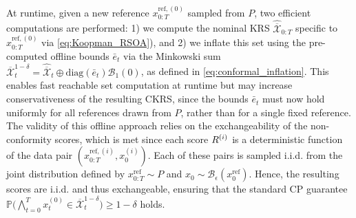 At runtime, given a new reference $x_{0:T}^{\text{ref}, (0)}$ sampled from $P$, two efficient computations are performed: 1) we compute the nominal KRS $\hat{\overline{\mathcal{X}}}_{0:T}$ specific to $x_{0:T}^{\text{ref}, (0)}$ via \eqref{eq:Koopman_RSOA}), and 2) we inflate this set using the pre-computed offline bounds $\bar e_t$ via the Minkowski sum $\overline{\mathcal{X}}_{t}^{1-\delta} = \hat{\overline{\mathcal{X}}}_{t} \oplus \textrm{diag}(\bar e_{t})\mathcal{B}_1(0)$, as defined in \eqref{eq:conformal_inflation}. This enables fast reachable set computation at runtime but may increase conservativeness of the resulting CKRS, since the bounds $\bar e_t$ must now hold uniformly for all references drawn from $P$, rather than for a single fixed reference. The validity of this offline approach relies on the exchangeability of the non-conformity scores, which is met since each score $R^{(i)}$ is a deterministic function of the data pair $(x_{0:T}^{\text{ref},(i)}, x_0^{(i)})$. Each of these pairs is sampled i.i.d. from the joint distribution defined by $x_{0:T}^{\text{ref}} \sim P$ and $x_0 \sim \mathcal{B}_\epsilon(x_{0}^{\text{ref}})$. Hence, the resulting scores are i.i.d. and thus exchangeable, ensuring that the standard CP guarantee $\mathbb{P}\big( \bigwedge_{t=0}^T x_t^{(0)} \in \overline{\mathcal{X}}_t^{1-\delta} \big) \ge 1-\delta$ holds.





